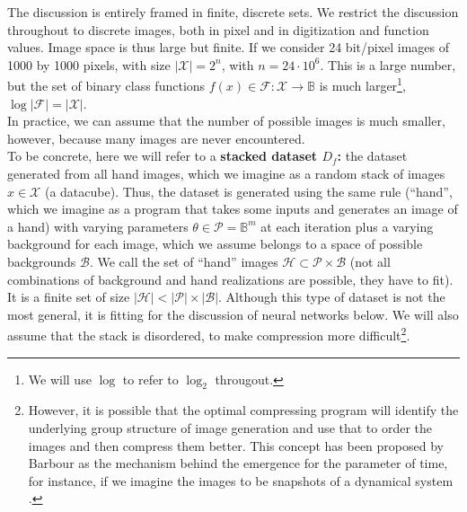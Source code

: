 \documentclass[11pt]{amsart}
\newcommand{\inputspace}{\mathcal X}
\newcommand{\handspace}{\mathcal H}
\begin{document}
The discussion is entirely framed in finite, discrete  sets. 
We  restrict the discussion throughout to discrete images, both in pixel and in digitization and function values.  Image space is thus large but finite. If we consider 24 bit/pixel images of 1000 by 1000 pixels, with size $ |\inputspace | = 2^n$, with $n=24\cdot 10 ^6$. This is a large number, but the set of binary class functions $f(x) \in \mathcal F: \inputspace  \rightarrow \mathbb B$ is much larger\footnote{We will use $\log$ to refer to $\log_{2}$ througout.}, $\log |\mathcal F| =  |\inputspace | $.\\

In practice, we can assume that the number of possible images is much smaller, however, because many images are never encountered. \\


To be  concrete, here we will refer to a {\bf stacked dataset $D_{f}$:} the dataset generated from all hand images, which we imagine as a random stack of  images $x \in \inputspace$ (a datacube).  Thus, the dataset is generated using the same rule (``hand'', which we imagine as a program that takes some inputs and generates an image of a hand)  with  varying parameters $\theta \in \mathcal P= \mathbb B^{m}$ at each iteration plus a varying background for each image, which we assume belongs to a space of possible backgrounds $\mathcal B$.  
We call the set of ``hand'' images $  \handspace \subset   \mathcal P \times  \mathcal B$ (not all combinations of background and hand realizations are possible, they have to fit). It is a finite set of size $|  \handspace| < |\mathcal P| \times | \mathcal B | $.  Although this type of dataset is not the most general, it is fitting for the discussion of neural networks below. We will also assume that the stack is disordered, to make compression more difficult\footnote{However, it is possible that the optimal compressing program will identify the underlying group structure of image generation and use that to order the images and then compress them better. This concept has been proposed by Barbour as the mechanism behind the emergence for the parameter of time, for instance, if we imagine the images to be snapshots of a dynamical system \cite{Barbour:1999aa}.}. \\
\end{document}
